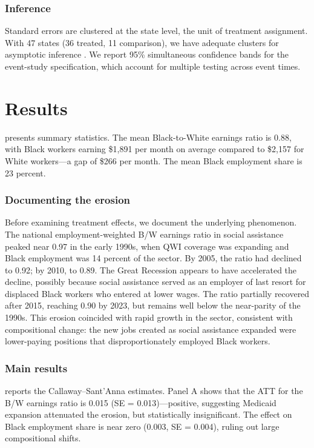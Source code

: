 \documentclass[12pt]{article}
\begin{document}
\subsubsection*{Inference} Standard errors are clustered at the state level, the unit of treatment assignment. With 47 states (36 treated, 11 comparison), we have adequate clusters for asymptotic inference \citep{callaway2021difference}. We report 95\% simultaneous confidence bands for the event-study specification, which account for multiple testing across event times.

\section{Results}

 presents summary statistics. The mean Black-to-White earnings ratio is 0.88, with Black workers earning \$1,891 per month on average compared to \$2,157 for White workers---a gap of \$266 per month. The mean Black employment share is 23 percent.

\subsubsection*{Documenting the erosion} Before examining treatment effects, we document the underlying phenomenon. The national employment-weighted B/W earnings ratio in social assistance peaked near 0.97 in the early 1990s, when QWI coverage was expanding and Black employment was 14 percent of the sector. By 2005, the ratio had declined to 0.92; by 2010, to 0.89. The Great Recession appears to have accelerated the decline, possibly because social assistance served as an employer of last resort for displaced Black workers who entered at lower wages. The ratio partially recovered after 2015, reaching 0.90 by 2023, but remains well below the near-parity of the 1990s. This erosion coincided with rapid growth in the sector, consistent with compositional change: the new jobs created as social assistance expanded were lower-paying positions that disproportionately employed Black workers.

\subsubsection*{Main results}  reports the Callaway--Sant'Anna estimates. Panel A shows that the ATT for the B/W earnings ratio is 0.015 (SE = 0.013)---positive, suggesting Medicaid expansion attenuated the erosion, but statistically insignificant. The effect on Black employment share is near zero (0.003, SE = 0.004), ruling out large compositional shifts.
\end{document}
